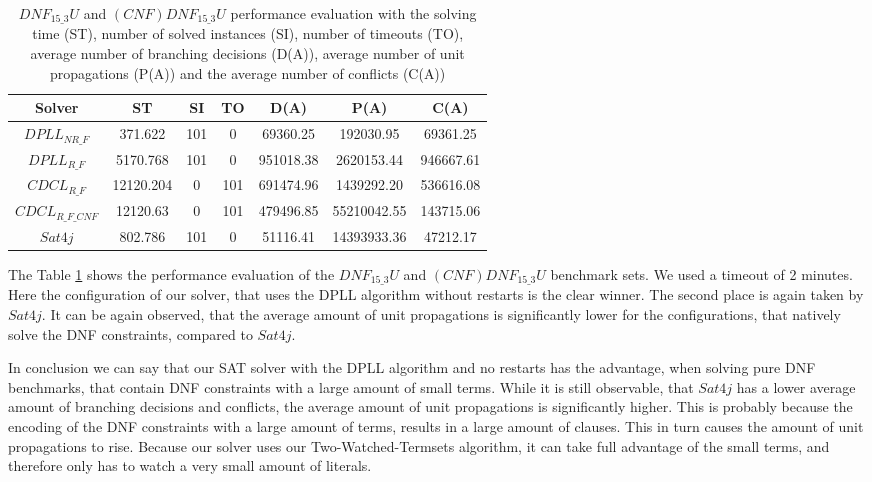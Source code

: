 \begin{table}[!htb]
\centering
\caption[$DNF_{15\_3}U$ and $(CNF)DNF_{15\_3}U$ performance evaluation]{$DNF_{15\_3}U$ and $(CNF)DNF_{15\_3}U$ performance evaluation with the solving time (ST), number of solved instances (SI), number of timeouts (TO), average number of branching decisions (D(A)), average number of unit propagations (P(A)) and the average number of conflicts (C(A))}
\label{tab:dnf153Unsat}
\begin{tabular}{|c|c|c|c|c|c|c|}
\hline
Solver & ST & SI & TO & D(A) & P(A) & C(A)\\ 
\hline
$DPLL_{NR\_F}$ & 371.622 & 101 & 0 & 69360.25 & 192030.95 & 69361.25 \\ 
\hline
$DPLL_{R\_F}$ & 5170.768 & 101 & 0 & 951018.38 & 2620153.44 & 946667.61 \\ 
\hline
$CDCL_{R\_F}$ & 12120.204 & 0 & 101 & 691474.96 & 1439292.20 & 536616.08 \\ 
\hline
$CDCL_{R\_F\_CNF}$ & 12120.63 & 0 & 101 & 479496.85 & 55210042.55 & 143715.06 \\ 
\hline
$Sat4j$ & 802.786 & 101 & 0 & 51116.41 & 14393933.36 & 47212.17 \\ 
\hline
\end{tabular}
\end{table}

The Table \ref{tab:dnf153Unsat} shows the performance evaluation of the $DNF_{15\_3}U$ and $(CNF)DNF_{15\_3}U$ benchmark sets. We used a timeout of 2 minutes. Here the configuration of our solver, that uses the DPLL algorithm without restarts is the clear winner. The second place is again taken by $Sat4j$. It can be again observed, that the average amount of unit propagations is significantly lower for the configurations, that natively solve the DNF constraints, compared to $Sat4j$.

In conclusion we can say that our SAT solver with the DPLL algorithm and no restarts has the advantage, when solving pure DNF benchmarks, that contain DNF constraints with a large amount of small terms. While it is still observable, that $Sat4j$ has a lower average amount of branching decisions and conflicts, the average amount of unit propagations is significantly higher. This is probably because the encoding of the DNF constraints with a large amount of terms, results in a large amount of clauses. This in turn causes the amount of unit propagations to rise. Because our solver uses our Two-Watched-Termsets algorithm, it can take full advantage of the small terms, and therefore only has to watch a very small amount of literals.

